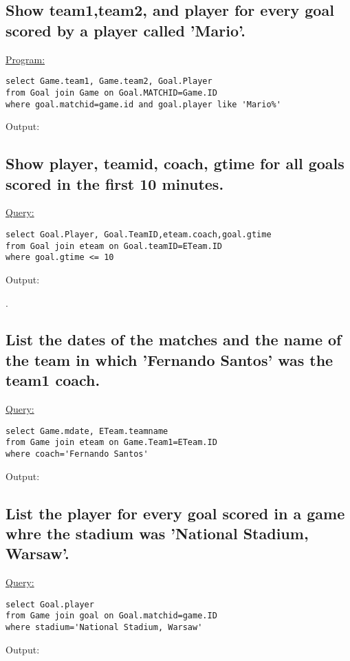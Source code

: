 \documentclass[a4paper,11pt]{article}
\begin{document}
\subsection{Show team1,team2, and player for every goal scored by a player called 'Mario'.}
\underline{Program:}
\begin{lstlisting}[showstringspaces=false]
select Game.team1, Game.team2, Goal.Player 
from Goal join Game on Goal.MATCHID=Game.ID
where goal.matchid=game.id and goal.player like 'Mario%'
\end{lstlisting}
Output:
\begin{figure}[H]
\centering
{}
\end{figure}
\bigskip


\subsection{Show player, teamid, coach, gtime for all goals scored in the first 10 minutes.}
\underline{Query:}
\begin{lstlisting}[showstringspaces=false]
select Goal.Player, Goal.TeamID,eteam.coach,goal.gtime 
from Goal join eteam on Goal.teamID=ETeam.ID
where goal.gtime <= 10
\end{lstlisting}
Output:
\begin{figure}[H]
\centering
{}
\end{figure}
.


\subsection{List the dates of the matches and the name of the team in which 'Fernando Santos' was the team1 coach.}
\underline{Query:}
\begin{lstlisting}[showstringspaces=false]
select Game.mdate, ETeam.teamname 
from Game join eteam on Game.Team1=ETeam.ID
where coach='Fernando Santos'
\end{lstlisting}
Output:
\begin{figure}[H]
\centering
{}
\end{figure}
\bigskip


\subsection{List the player for every goal scored in a game  whre the stadium was 'National Stadium, Warsaw'.}
\underline{Query:}
\begin{lstlisting}[showstringspaces=false]
select Goal.player
from Game join goal on Goal.matchid=game.ID
where stadium='National Stadium, Warsaw'

\end{lstlisting}
Output:
\begin{figure}[H]
\centering
{}
\end{figure}
\bigskip
\end{document}
